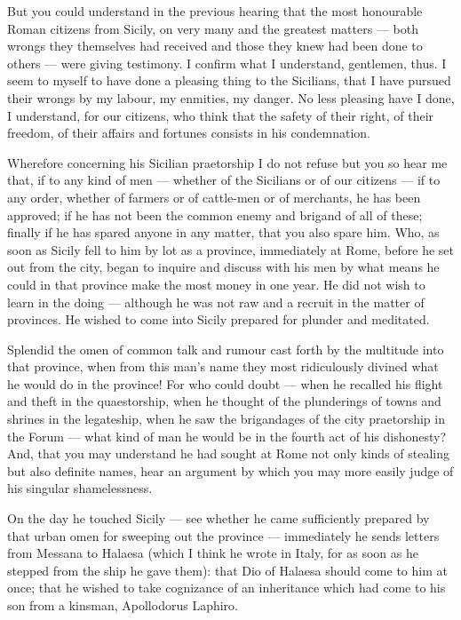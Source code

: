  But you could understand in the previous hearing that the most honourable Roman citizens from Sicily, on very many and the greatest matters --- both wrongs they themselves had received and those they knew had been done to others --- were giving testimony. I confirm what I understand, gentlemen, thus. I seem to myself to have done a pleasing thing to the Sicilians, that I have pursued their wrongs by my labour, my enmities, my danger. No less pleasing have I done, I understand, for our citizens, who think that the safety of their right, of their freedom, of their affairs and fortunes consists in his condemnation.

 Wherefore concerning his Sicilian praetorship I do not refuse but you so hear me that, if to any kind of men --- whether of the Sicilians or of our citizens --- if to any order, whether of farmers or of cattle-men or of merchants, he has been approved; if he has not been the common enemy and brigand of all of these; finally if he has spared anyone in any matter, that you also spare him. Who, as soon as Sicily fell to him by lot as a province, immediately at Rome, before he set out from the city, began to inquire and discuss with his men by what means he could in that province make the most money in one year. He did not wish to learn in the doing --- although he was not raw and a recruit in the matter of provinces. He wished to come into Sicily prepared for plunder and meditated.

 Splendid the omen of common talk and rumour cast forth by the multitude into that province, when from this man's name they most ridiculously divined what he would do in the province! For who could doubt --- when he recalled his flight and theft in the quaestorship, when he thought of the plunderings of towns and shrines in the legateship, when he saw the brigandages of the city praetorship in the Forum --- what kind of man he would be in the fourth act of his dishonesty? And, that you may understand he had sought at Rome not only kinds of stealing but also definite names, hear an argument by which you may more easily judge of his singular shamelessness.

 On the day he touched Sicily --- see whether he came sufficiently prepared by that urban omen for sweeping out the province --- immediately he sends letters from Messana to Halaesa (which I think he wrote in Italy, for as soon as he stepped from the ship he gave them): that Dio of Halaesa should come to him at once; that he wished to take cognizance of an inheritance which had come to his son from a kinsman, Apollodorus Laphiro.

